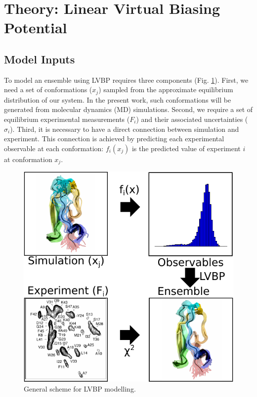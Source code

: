 \documentclass[journal=jacsat,manuscript=article]{achemso}
\begin{document}
\section{Theory: Linear Virtual Biasing Potential}

\subsection{Model Inputs}

To model an ensemble using LVBP requires three components (Fig. \ref{figure:LVBP}).  First, we need a set of conformations ($x_j$) sampled from the approximate equilibrium distribution of our system.  In the present work, such conformations will be generated from molecular dynamics (MD) simulations.  Second, we require a set of equilibrium experimental measurements ($F_i$) and their associated uncertainties ($\sigma_i$).  Third, it is necessary to have a direct connection between simulation and experiment.  This connection is achieved by predicting each experimental observable at each conformation: $f_i(x_j)$ is the predicted value of experiment $i$ at conformation $x_j$.  

\begin{figure}

\includegraphics[width=18.0cm]{figures/info_graphic/info_graphic.pdf}

\caption{
General scheme for LVBP modelling.
}
\label{figure:LVBP}
\end{figure}
\end{document}
